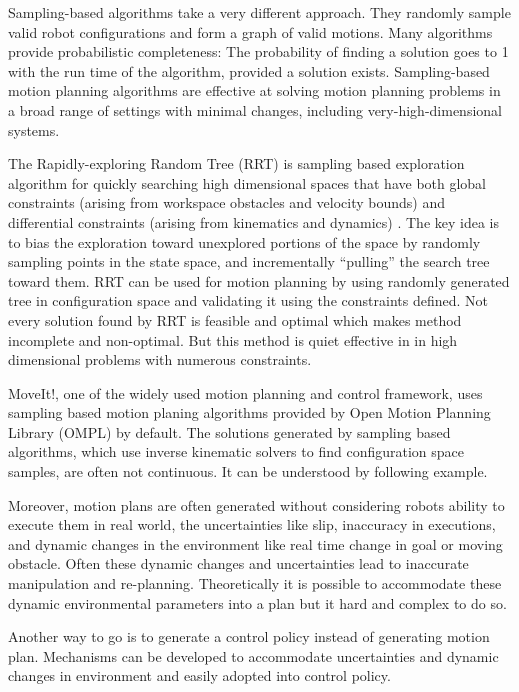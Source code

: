 Sampling-based algorithms take a very different approach. They randomly sample valid robot configurations and form a graph of valid motions. Many algorithms provide probabilistic completeness: The probability of finding a solution goes to 1 with the run time of the algorithm,
provided a solution exists. Sampling-based motion planning algorithms are effective at solving motion planning problems in a broad range of settings with minimal changes, including very-high-dimensional systems\cite{kingston2018sampling}. 

The Rapidly-exploring Random Tree (RRT) is sampling based exploration algorithm for quickly searching high dimensional spaces that have both global constraints (arising from workspace obstacles and velocity bounds) and differential constraints (arising from kinematics and dynamics) \cite{lavalle2003dynamic}. The key idea is to bias the exploration toward unexplored portions of the space by randomly sampling points in the state space, and incrementally “pulling” the search tree toward them. RRT can be used for motion planning by using randomly generated tree in configuration space and validating it using the constraints defined. Not every solution found by RRT is feasible and optimal which makes method incomplete and non-optimal. But this method is quiet effective in in high dimensional problems with numerous constraints. 

MoveIt!, one of the widely used motion planning and control framework, uses sampling based motion planing algorithms provided by Open Motion Planning Library (OMPL) by default. The solutions generated by sampling based algorithms, which use inverse kinematic solvers to find configuration space samples, are often not continuous. It can be understood by following example. 

Moreover, motion plans are often generated without considering robots ability to execute them in real world, the uncertainties like slip, inaccuracy in executions, and dynamic changes in the environment like real time change in goal or moving obstacle. Often these dynamic changes and uncertainties lead to inaccurate manipulation and re-planning. Theoretically it is possible to accommodate these dynamic environmental parameters into a plan but it hard and complex to do so. 

Another way to go is to generate a control policy instead of generating motion plan. Mechanisms can be developed to accommodate uncertainties and dynamic changes in environment and easily adopted into control policy.  

